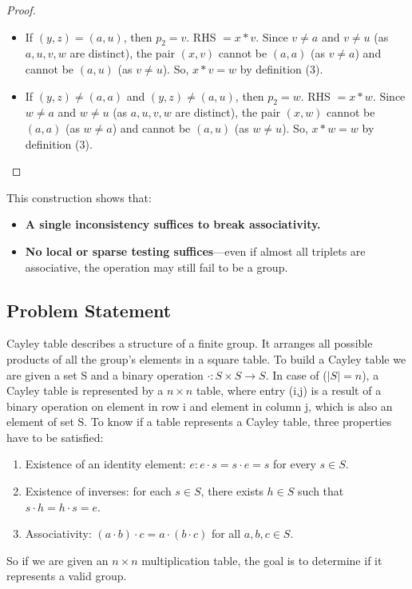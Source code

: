 \documentclass[sigconf]{acmart}
\begin{document}
\begin{proof}
\begin{itemize}
\begin{itemize}
    \end{itemize}
    \item If $(y,z) = (a,u)$, then $p_2 = v$. RHS $= x \ast v$.
    Since $v \neq a$ and $v \neq u$ (as $a,u,v,w$ are distinct), the pair $(x,v)$ cannot be $(a,a)$ (as $v \neq a$) and cannot be $(a,u)$ (as $v \neq u$). So, $x \ast v = w$ by definition (3).
    \item If $(y,z) \neq (a,a)$ and $(y,z) \neq (a,u)$, then $p_2 = w$. RHS $= x \ast w$.
    Since $w \neq a$ and $w \neq u$ (as $a,u,v,w$ are distinct), the pair $(x,w)$ cannot be $(a,a)$ (as $w \neq a$) and cannot be $(a,u)$ (as $w \neq u$). So, $x \ast w = w$ by definition (3).
\end{itemize}

\end{proof}

This construction shows that:
\begin{itemize}
    \item \textbf{A single inconsistency suffices to break associativity.}
    \item \textbf{No local or sparse testing suffices}—even if almost all triplets are associative, the operation may still fail to be a group.
\end{itemize}

\subsection{Problem Statement}
Cayley table describes a structure of a finite group. It arranges all possible products of all the group's elements in a square table. To build a Cayley table we are given a set S and a binary operation \(\cdot : S \times S \rightarrow S\). In case of (\(|S| = n\)), a Cayley table is represented by a \(n\times n\) table, where entry (i,j) is a result of a binary operation on element in row i and element in column j, which is also an element of set S.
To know if a table represents a Cayley table, three properties have to be satisfied:
\begin{enumerate}
    \item Existence of an identity element: \(e: e \cdot s = s \cdot e = s\) for every \(s \in S\).
    \item Existence of inverses: for each \(s \in S\), there exists \(h \in S\) such that \(s \cdot h = h \cdot s = e\).
    \item Associativity: \((a \cdot b) \cdot c = a \cdot (b \cdot c)\) for all \(a,b,c \in S\).
\end{enumerate}
So if we are given an \( n \times n \) multiplication table, the goal is to determine if it represents a valid group.
\end{document}
